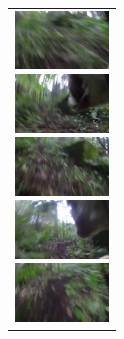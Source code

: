 \begin{enumerate}
\begin{end}
\begin{figure}[H]
\begin{tabular}{l}
      \begin{minipage}{0.165\hsize}
        \begin{center}
          \includegraphics[clip, width=2.5cm]{./Figures/still_run1.eps}
        \end{center}
      \end{minipage}
      \begin{minipage}{0.165\hsize}
        \begin{center}
          \includegraphics[clip, width=2.5cm]{./Figures/still_run2.eps}
        \end{center}
      \end{minipage}
      \begin{minipage}{0.165\hsize}
        \begin{center}
          \includegraphics[clip, width=2.5cm]{./Figures/still_run3.eps}
        \end{center}
      \end{minipage}
      \begin{minipage}{0.165\hsize}
        \begin{center}
          \includegraphics[clip, width=2.5cm]{./Figures/still_run4.eps}
        \end{center}
      \end{minipage}
      \begin{minipage}{0.165\hsize}
        \begin{center}
          \includegraphics[clip, width=2.5cm]{./Figures/still_run5.eps}

\end{center}
\end{minipage}
\end{tabular}
\end{figure}
\end{end}
\end{enumerate}
